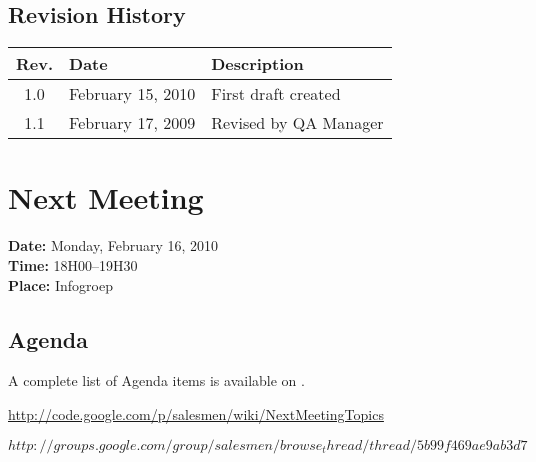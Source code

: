 \documentclass[a4paper, 12pt]{article}
\begin{document}
		\subsection{Revision History}
			\begin{tabular}{c | l | l }
				\textbf{Rev.} & \textbf{Date} & \textbf{Description} \\
				\hline
				1.0 & February 15, 2010 & First draft created \\
				1.1 & February 17, 2009 & Revised by QA Manager \\
			\end{tabular}		

	\section{Next Meeting}

		\textbf{Date:} Monday, February 16, 2010\\
		\textbf{Time:} 18H00--19H30\\
		\textbf{Place:} Infogroep\\
	
		\subsection{Agenda}
A complete list of Agenda items is available on \cite{agendaitems}.\\
	
	\begin{thebibliography}{99}
		
		\href{http://code.google.com/p/salesmen/wiki/NextMeetingTopics}{http://code.google.com/p/salesmen/wiki/NextMeetingTopics}

		\href{http://groups.google.com/group/salesmen/browse_thread/thread/5b99f469ae9ab3d7}{$http://groups.google.com/group/salesmen/browse_thread/thread/5b99f469ae9ab3d7$}
		
	\end{thebibliography}	
		
\end{document}

